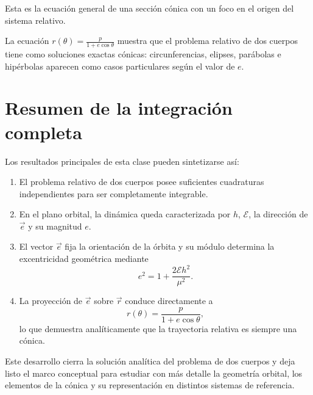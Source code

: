 Esta es la ecuación general de una sección cónica con un foco en el origen del sistema relativo.

\begin{importante}
La ecuación \(r(\theta) = \frac{p}{1 + e\cos\theta}\) muestra que el problema relativo de dos cuerpos tiene como soluciones exactas cónicas: circunferencias, elipses, parábolas e hipérbolas aparecen como casos particulares según el valor de \(e\).
\end{importante}

\section{Resumen de la integración completa}
Los resultados principales de esta clase pueden sintetizarse así:
\begin{enumerate}
    \item El problema relativo de dos cuerpos posee suficientes cuadraturas independientes para ser completamente integrable.
    \item En el plano orbital, la dinámica queda caracterizada por \(h\), \(\mathcal{E}\), la dirección de \(\vec{e}\) y su magnitud \(e\).
    \item El vector \(\vec{e}\) fija la orientación de la órbita y su módulo determina la excentricidad geométrica mediante
\[
 e^2 = 1 + \frac{2\mathcal{E}h^2}{\mu^2}.
\]
    \item La proyección de \(\vec{e}\) sobre \(\vec{r}\) conduce directamente a
\[
 r(\theta) = \frac{p}{1 + e\cos\theta},
\]
lo que demuestra analíticamente que la trayectoria relativa es siempre una cónica.
\end{enumerate}

Este desarrollo cierra la solución analítica del problema de dos cuerpos y deja listo el marco conceptual para estudiar con más detalle la geometría orbital, los elementos de la cónica y su representación en distintos sistemas de referencia.